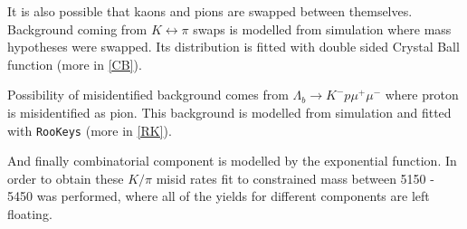It is also possible that kaons and pions are swapped between themselves. Background coming from $K \leftrightarrow \pi$ swaps is modelled from simulation where mass hypotheses were swapped. Its distribution is fitted with double sided Crystal Ball function \cite{Skwarnicki:1986xj} (more in \autoref{CB}).

Possibility of misidentified background comes from $\Lambda_{b} \rightarrow K^{-} p \mu^{+} \mu^{-}$ where proton is misidentified as pion. This background is modelled from simulation and fitted with \texttt{RooKeys} (more in \autoref{RK}).

And finally combinatorial component is modelled by the exponential function.
In order to obtain these $K/\pi$ misid rates fit to constrained mass between 5150 - 5450 \mevcc was performed, where all of the yields for different components are left floating.
